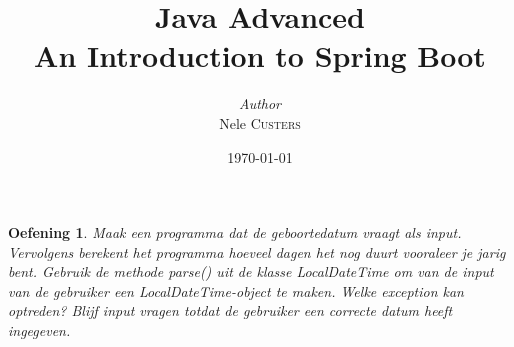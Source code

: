 \documentclass[a4paper, 12pt]{report}
\institute{Hogeschool PXL}
\title{Java Advanced\\An Introduction to Spring Boot}
\author{\textit{Author}\\Nele \textsc{Custers}}
\date{\today}
\newenvironment{boxexercise}
{\begin{tcolorbox}
[enhanced jigsaw,breakable,pad at break*=1mm,
 colback=tsyellow!20,boxrule=0pt,frame hidden]}
{\end{tcolorbox}}
\newtheorem{envoefening}{\textbf{Oefening}}[chapter]
\newenvironment{oefening}
               {\begin{boxexercise}\begin{envoefening}}
               {\end{envoefening}\end{boxexercise}}
\begin{document}
    \maketitle
    \romantableofcontents
    
 
  













 
 
\begin{oefening}
Maak een programma dat de geboortedatum vraagt als input. Vervolgens berekent het programma hoeveel dagen het nog duurt vooraleer je jarig bent. Gebruik de methode parse() uit de klasse LocalDateTime om van de input van de gebruiker een LocalDateTime-object te maken. Welke exception kan optreden? Blijf input vragen totdat de gebruiker een correcte datum heeft ingegeven.
\end{oefening}

\printbibliography
\end{document}
